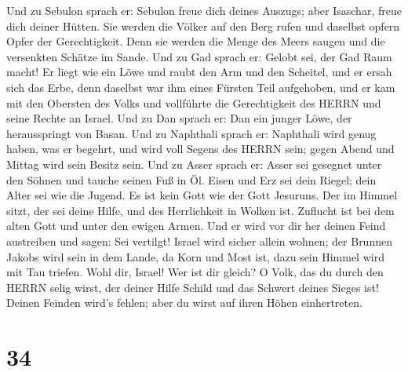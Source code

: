 Und zu Sebulon sprach er: Sebulon freue dich deines Auszugs; aber
Isaschar, freue dich deiner Hütten.  Sie werden die Völker
auf den Berg rufen und daselbst opfern Opfer der Gerechtigkeit. Denn sie
werden die Menge des Meers saugen und die versenkten Schätze im Sande.
 Und zu Gad sprach er: Gelobt sei, der Gad Raum macht! Er
liegt wie ein Löwe und raubt den Arm und den Scheitel,  und
er ersah sich das Erbe, denn daselbst war ihm eines Fürsten Teil
aufgehoben, und er kam mit den Obersten des Volks und vollführte die
Gerechtigkeit des HERRN und seine Rechte an Israel.  Und zu
Dan sprach er: Dan ein junger Löwe, der herausspringt von Basan.
 Und zu Naphthali sprach er: Naphthali wird genug haben,
was er begehrt, und wird voll Segens des HERRN sein; gegen Abend und
Mittag wird sein Besitz sein.  Und zu Asser sprach er:
Asser sei gesegnet unter den Söhnen und tauche seinen Fuß in Öl.
 Eisen und Erz sei dein Riegel; dein Alter sei wie die
Jugend.  Es ist kein Gott wie der Gott Jesuruns. Der im
Himmel sitzt, der sei deine Hilfe, und des Herrlichkeit in Wolken ist.
 Zuflucht ist bei dem alten Gott und unter den ewigen
Armen. Und er wird vor dir her deinen Feind austreiben und sagen: Sei
vertilgt!  Israel wird sicher allein wohnen; der Brunnen
Jakobs wird sein in dem Lande, da Korn und Most ist, dazu sein Himmel
wird mit Tau triefen.  Wohl dir, Israel! Wer ist dir
gleich? O Volk, das du durch den HERRN selig wirst, der deiner Hilfe
Schild und das Schwert deines Sieges ist! Deinen Feinden wird's fehlen;
aber du wirst auf ihren Höhen einhertreten.

\hypertarget{section-33}{%
\section{34}\label{section-33}}

